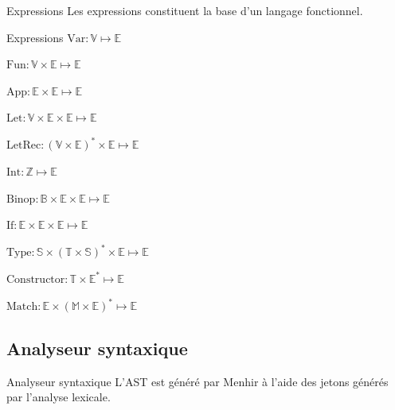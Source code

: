 \documentclass{beamer}
\begin{document}
\begin{frame}{Expressions}
    Les expressions constituent la base d'un langage fonctionnel.%

    \begin{block}{Expressions}
        $\text{Var} : \mathbb{V} \mapsto \mathbb{E}$%

        $\text{Fun} : \mathbb{V} \times \mathbb{E} \mapsto \mathbb{E}$%

        $\text{App} : \mathbb{E} \times \mathbb{E} \mapsto \mathbb{E}$%

        $\text{Let} : \mathbb{V} \times \mathbb{E} \times \mathbb{E} \mapsto \mathbb{E}$%

        $\text{LetRec} : (\mathbb{V} \times \mathbb{E})^{*} \times \mathbb{E} \mapsto \mathbb{E}$%

        $\text{Int} : \mathbb{Z} \mapsto \mathbb{E}$%

        $\text{Binop} : \mathbb{B} \times \mathbb{E} \times \mathbb{E} \mapsto \mathbb{E}$%

        $\text{If} : \mathbb{E} \times \mathbb{E} \times \mathbb{E} \mapsto \mathbb{E}$%

        $\text{Type} : \mathbb{S} \times (\mathbb{T} \times \mathbb{S})^{*} \times \mathbb{E} \mapsto \mathbb{E}$%

        $\text{Constructor} : \mathbb{T} \times \mathbb{E}^{*} \mapsto \mathbb{E}$%

        $\text{Match} : \mathbb{E} \times (\mathbb{M} \times \mathbb{E})^{*} \mapsto \mathbb{E}$%
    \end{block}
\end{frame}

\subsection{Analyseur syntaxique}

\begin{frame}{Analyseur syntaxique}
    L'AST est généré par Menhir à l'aide des jetons générés par l'analyse lexicale.
\end{frame}
\end{document}
